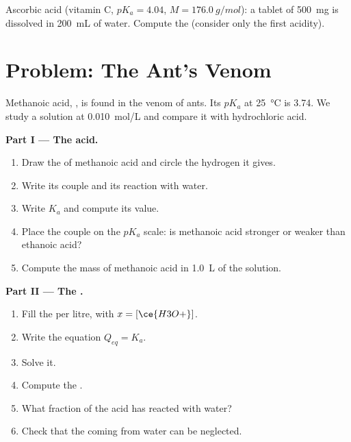 \begin{exercise}[$\star\star\star$]\label{exo:g12:ka-and-pka:15}
Ascorbic acid (vitamin C, $pK_a = 4.04$, $M = \qty{176.0}{g/mol}$): a
tablet of \qty{500}{mg} is dissolved in \qty{200}{mL} of water. Compute
the  (consider only the first acidity).
\end{exercise}

\section{Problem: The Ant's Venom}


\begin{problem}
\label{pb:g12:ka-and-pka:1}
Methanoic acid, , is found in the venom of ants. Its $pK_a$ at
\qty{25}{\celsius} is 3.74. We study a solution at \qty{0.010}{mol/L} and
compare it with hydrochloric acid.

\medskip
\noindent\textbf{Part I --- The acid.}
\begin{enumerate}
  \item Draw the  of methanoic acid and circle the
        hydrogen it gives.
  \item Write its couple and its reaction with water.
  \item Write $K_a$ and compute its value.
  \item Place the couple on the $pK_a$ scale: is methanoic acid stronger
        or weaker than ethanoic acid?
  \item Compute the mass of methanoic acid in \qty{1.0}{L} of the
        solution.
\end{enumerate}

\medskip
\noindent\textbf{Part II --- The .}
\begin{enumerate}[resume]
  \item Fill the  per litre, with $x = [\ce{H3O+}]$.
  \item Write the equation $Q_{eq} = K_a$.
  \item Solve it.
  \item Compute the .
  \item What fraction of the acid has reacted with water?
  \item Check that the  coming from water can be neglected.
\end{enumerate}


\end{problem}
